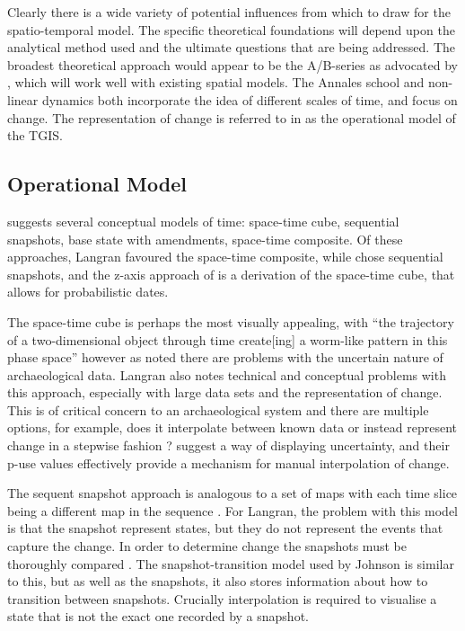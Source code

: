 Clearly there is a wide variety of potential influences from which to draw for the spatio-temporal model. The specific theoretical foundations will depend upon the analytical method used and the ultimate questions that are being addressed. The broadest theoretical approach would appear to be the A/B-series as advocated by \citet{Gell:1992fk}, which will work well with existing spatial models. The Annales school and non-linear dynamics both incorporate the idea of different scales of time, and focus on change. The representation of change is referred to in \citet{Castleford:1992fk} as the operational model of the TGIS.

\subsection{Operational Model}
\citet{Langran:1992uq} suggests several conceptual models of time: space-time cube, sequential snapshots, base state with amendments, space-time composite. Of these approaches, Langran favoured the space-time composite, while \citet{Johnson:1999cr} chose sequential snapshots, and the z-axis approach of \citet{lock2002analysing} is a derivation of the space-time cube, that allows for probabilistic dates. 

The space-time cube is perhaps the most visually appealing, with ``the trajectory of a two-dimensional object through time create[ing] a worm-like pattern in this phase space'' \cite[37]{Langran:1992uq} however as \citet{lock2002analysing} noted there are problems with the uncertain nature of archaeological data. Langran also notes technical and conceptual problems with this approach, especially with large data sets and the representation of change. This is of critical concern to an archaeological system and there are multiple options, for example, does it interpolate between known data or instead represent change in a stepwise fashion \citep{Langran:1992uq}? \citet{lock2002analysing} suggest a way of displaying uncertainty, and their p-use values effectively provide a mechanism for manual interpolation of change.

The sequent snapshot approach is analogous to a set of maps with each time slice being a different map in the sequence \citep{Langran:1992uq}. For Langran, the problem with this model is that the snapshot represent states, but they do not represent the events that capture the change. In order to determine change the snapshots must be thoroughly compared \citep{Langran:1992uq}. The snapshot-transition model used by Johnson is similar to this, but as well as the snapshots, it also stores information about how to transition between snapshots. Crucially interpolation is required to visualise a state that is not the exact one recorded by a snapshot. 

